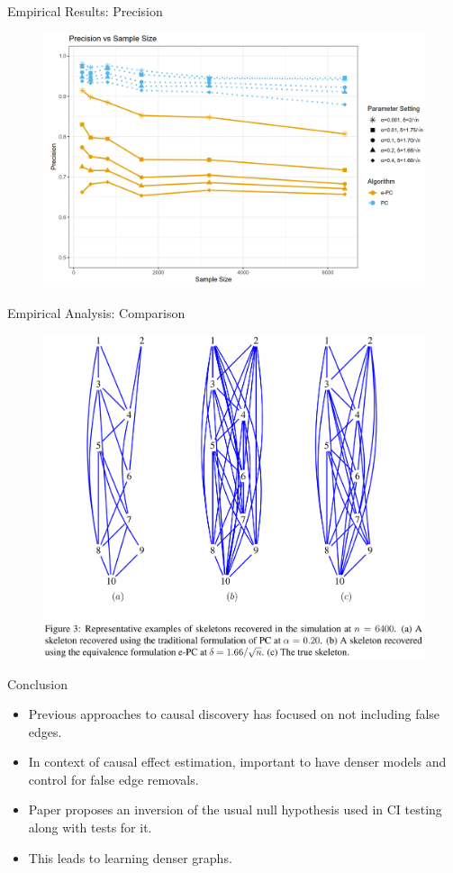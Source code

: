 \documentclass{beamer}
\begin{document}
\begin{frame}{Empirical Results: Precision}
	\begin{figure}
		\centering
		\includegraphics[scale=0.2]{imgs/precision.png}
	\end{figure}
\end{frame}

\begin{frame}{Empirical Analysis: Comparison}
	\begin{figure}
		\centering
		\includegraphics[scale=0.12]{imgs/empirical_compare.png}
	\end{figure}
\end{frame}

\begin{frame}{Conclusion}
	\begin{itemize}
		\item Previous approaches to causal discovery has focused on not including false edges.
		\item In context of causal effect estimation, important to have denser models and control for false edge removals.
		\item Paper proposes an inversion of the usual null hypothesis used in CI testing along with tests for it.
		\item This leads to learning denser graphs.
	\end{itemize}
\end{frame}
\end{document}
